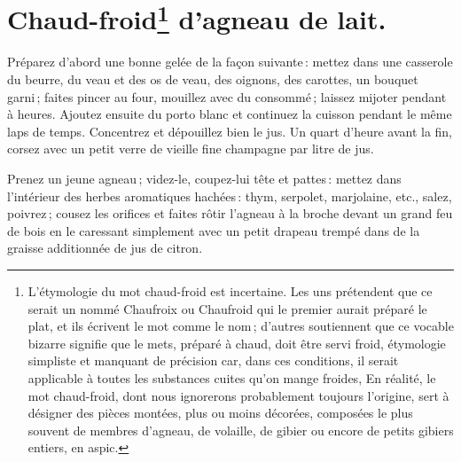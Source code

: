 \section*{\centering Chaud-froid\footnote{
                                          L'étymologie du mot chaud-froid est incertaine. Les uns
                                          prétendent que ce serait un nommé Chaufroix ou Chaufroid
                                          qui le premier aurait préparé le plat, et ils écrivent
                                          le mot comme le nom ; d’autres soutiennent que ce vocable
                                          bizarre signifie que le mets, préparé à chaud, doit être
                                          servi froid, étymologie simpliste et manquant de précision
                                          car, dans ces conditions, il serait applicable à toutes
                                          les substances cuites qu'on mange froides,
                                          \protect\endgraf
                                          En réalité, le mot chaud-froid, dont nous ignorerons
                                          probablement toujours l'origine, sert à désigner des pièces
                                          montées, plus ou moins décorées, composées le plus souvent
                                          de membres d'agneau, de volaille, de gibier ou encore de
                                          petits gibiers entiers, en aspic.} d'agneau de lait.}
{}

Préparez d'abord une bonne gelée de la façon suivante : mettez dans une
casserole du beurre, du veau et des os de veau, des oignons, des carottes, un
bouquet garni ; faites pincer au four, mouillez avec du consommé ; laissez
mijoter pendant {\mmm} à {\mmm} heures. Ajoutez ensuite du porto blanc et continuez la
cuisson pendant le même laps de temps. Concentrez et dépouillez bien le jus. Un
quart d'heure avant la fin, corsez avec un petit verre de vieille fine
champagne par litre de jus.

Prenez un jeune agneau ; videz-le, coupez-lui tête et pattes : mettez dans
l'intérieur des herbes aromatiques hachées : thym, serpolet, marjolaine, etc.,
salez, poivrez ; cousez les orifices et faites rôtir l'agneau à la broche
devant un grand feu de bois en le caressant simplement avec un petit drapeau
trempé dans de la graisse additionnée de jus de citron.

